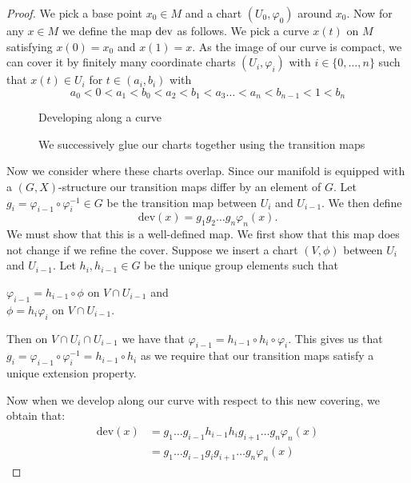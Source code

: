 \begin{proof}
    We pick a base point $x_0 \in M$ and a chart $(U_0, \varphi_0)$ around $x_0$. Now for any $x \in M$ we define the map $\text{dev}$ as follows. We pick a curve $x(t)$ on $M$ satisfying $x(0)=x_0$ and $x(1)=x$. As the image of our curve is compact, we can cover it by finitely many coordinate charts $(U_i, \varphi_i)$ with $i\in \{0, \dots,n\}$ such that $x(t) \in U_i$ for $t\in(a_i, b_i)$ with
    $$a_0<0<a_1<b_0<a_2<b_1<a_3 \dots <a_n<b_{n-1}<1<b_n$$

    \begin{figure}[H]
        \centering
        \caption{Developing along a curve}
    \end{figure}

    \begin{figure}[H]
        \centering
        \caption{We successively glue our charts together using the transition maps}
    \end{figure}

    Now we consider where these charts overlap. Since our manifold is equipped with
    a $(G,X)$-structure our transition maps differ by an element of $G$. Let $g_i =
        \varphi_{i-1}\circ\varphi^{-1}_i \in G$ be the transition map between $U_i$ and
    $U_{i-1}$. We then define $$ \text{dev}(x) = g_1g_2\dots g_n \varphi_n(x) .$$
    We must show that this is a well-defined map. We first show that this map does
    not change if we refine the cover. Suppose we insert a chart $(V, \phi)$
    between $U_i$ and $U_{i-1}$. Let $h_i, h_{i-1} \in G$ be the unique group
    elements such that
    \begin{center}
        $\varphi_{i-1} = h_{i-1}\circ\phi$ on $V \cap U_{i-1}$ and \\
        $\phi = h_i\varphi_{i}$ on $V \cap U_{i-1}$.
    \end{center}
    Then on $V \cap U_i \cap U_{i-1}$ we have that $\varphi_{i-1} = h_{i-1}\circ h_i \circ \varphi_{i}$. This gives us that $g_i = \varphi_{i-1}\circ \varphi^{-1}_i = h_{i-1} \circ h_i$ as we require that our transition maps satisfy a unique extension property.

    Now when we develop along our curve with respect to this new covering, we
    obtain that:
    \begin{align*}
        \text{dev}(x) & = g_1 \dots g_{i-1}h_{i-1}h_{i}g_{i+1}\dots g_n\varphi_n(x) \\
                      & = g_1 \dots g_{i-1}g_ig_{i+1}\dots g_n\varphi_n(x)
    \end{align*}


\end{proof}
